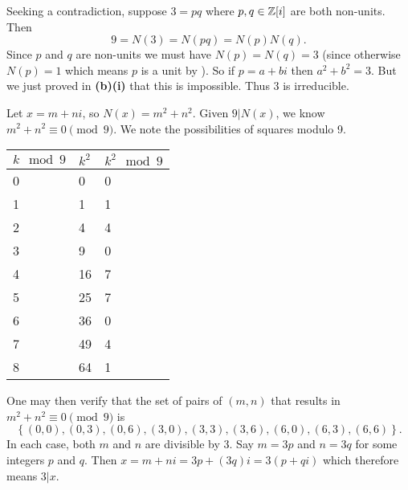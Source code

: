 \begin{questions}
\begin{partquestions}{\alph*}
\begin{partquestions}{\roman*}
            \item Seeking a contradiction, suppose $3 = pq$ where $p,q\in\mathbb{Z}[i]$ are both non-units. Then
            \[
                9 = N(3) = N(pq) = N(p)N(q).
            \]
            Since $p$ and $q$ are non-units we must have $N(p) = N(q) = 3$ (since otherwise $N(p) = 1$ which means $p$ is a unit by ). So if $p = a+bi$ then $a^2+b^2 = 3$. But we just proved in \textbf{(b)(i)} that this is impossible. Thus 3 is irreducible.

            \item Let $x = m+ni$, so $N(x) = m^2 + n^2$. Given $9 \vert N(x)$, we know $m^2 + n^2 \equiv 0 \pmod9$. We note the possibilities of squares modulo 9.
            \begin{table}[H]
                \centering
                \begin{tabular}{|l|l|l|}
                    \hline
                    $k\mod9$ & $k^2$ & $k^2\mod9$ \\ \hline
                    0 & 0 & 0 \\ \hline
                    1 & 1 & 1 \\ \hline
                    2 & 4 & 4 \\ \hline
                    3 & 9 & 0 \\ \hline
                    4 & 16 & 7 \\ \hline
                    5 & 25 & 7 \\ \hline
                    6 & 36 & 0 \\ \hline
                    7 & 49 & 4 \\ \hline
                    8 & 64 & 1 \\ \hline
                \end{tabular}
            \end{table}
            One may then verify that the set of pairs of $(m,n)$ that results in $m^2 + n^2 \equiv 0 \pmod9$ is
            \[
                \left\{(0,0),(0,3),(0,6),(3,0),(3,3),(3,6),(6,0),(6,3),(6,6)\right\}.
            \]
            In each case, both $m$ and $n$ are divisible by 3. Say $m = 3p$ and $n = 3q$ for some integers $p$ and $q$. Then $x = m + ni = 3p + (3q)i = 3(p+qi)$ which therefore means $3 \vert x$.


\end{partquestions}
\end{partquestions}
\end{questions}
